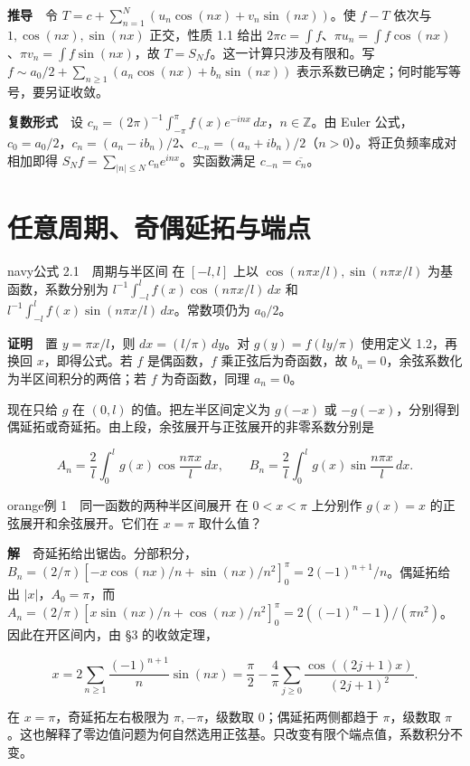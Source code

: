 \documentclass[12pt,a4paper]{article}
\newcommand{\mysection}[1]{\clearpage\section{#1}}
\begin{document}
\textbf{推导}　令 \(T=c+\sum_{n=1}^N (u_n\cos(nx)+v_n\sin(nx))\)。使 \(f-T\) 依次与 \(1,\cos(nx),\sin(nx)\) 正交，性质 1.1 给出 \(2\pi c=\int f\)、\(\pi u_n=\int f\cos(nx)\)、\(\pi v_n=\int f\sin(nx)\)，故 \(T=S_Nf\)。这一计算只涉及有限和。写 \(f\sim a_0/2+\sum_{n\ge1}(a_n\cos(nx)+b_n\sin(nx))\) 表示系数已确定；何时能写等号，要另证收敛。

\textbf{复数形式}　设 \(c_n=(2\pi)^{-1}\int_{-\pi}^{\pi}f(x)e^{-inx}\,dx\)，\(n\in\mathbb Z\)。由 Euler 公式，\(c_0=a_0/2\)，\(c_n=(a_n-ib_n)/2\)、\(c_{-n}=(a_n+ib_n)/2\)（\(n>0\)）。将正负频率成对相加即得 \(S_N f=\sum_{|n|\le N}c_ne^{inx}\)。实函数满足 \(c_{-n}=\overline{c_n}\)。

\mysection{任意周期、奇偶延拓与端点}




\begin{sboxenv}{navy}{公式 2.1　周期与半区间}
在 \([-l,l]\) 上以 \(\cos(n\pi x/l),\sin(n\pi x/l)\) 为基函数，系数分别为 \(l^{-1}\int_{-l}^l f(x)\cos(n\pi x/l)\,dx\) 和 \(l^{-1}\int_{-l}^l f(x)\sin(n\pi x/l)\,dx\)。常数项仍为 \(a_0/2\)。
\end{sboxenv}

\textbf{证明}　置 \(y=\pi x/l\)，则 \(dx=(l/\pi)\,dy\)。对 \(g(y)=f(ly/\pi)\) 使用定义 1.2，再换回 \(x\)，即得公式。若 \(f\) 是偶函数，\(f\) 乘正弦后为奇函数，故 \(b_n=0\)，余弦系数化为半区间积分的两倍；若 \(f\) 为奇函数，同理 \(a_n=0\)。

现在只给 \(g\) 在 \((0,l)\) 的值。把左半区间定义为 \(g(-x)\) 或 \(-g(-x)\)，分别得到偶延拓或奇延拓。由上段，余弦展开与正弦展开的非零系数分别是

\[
 A_n=\frac{2}{l}\int_0^l g(x)\cos\frac{n\pi x}{l}\,dx,\qquad
 B_n=\frac{2}{l}\int_0^l g(x)\sin\frac{n\pi x}{l}\,dx .
\]

\begin{sboxenv}{orange}{例 1　同一函数的两种半区间展开}
在 \(0<x<\pi\) 上分别作 \(g(x)=x\) 的正弦展开和余弦展开。它们在 \(x=\pi\) 取什么值？
\end{sboxenv}

\textbf{解}　奇延拓给出锯齿。分部积分，\(B_n=(2/\pi)[-x\cos(nx)/n+\sin(nx)/n^2]_0^\pi=2(-1)^{n+1}/n\)。偶延拓给出 \(|x|\)，\(A_0=\pi\)，而 \(A_n=(2/\pi)[x\sin(nx)/n+\cos(nx)/n^2]_0^\pi=2((-1)^n-1)/(\pi n^2)\)。因此在开区间内，由 §3 的收敛定理，

\[
 x=2\sum_{n\ge1}\frac{(-1)^{n+1}}{n}\sin(nx)
 =\frac{\pi}{2}-\frac{4}{\pi}\sum_{j\ge0}
 \frac{\cos((2j+1)x)}{(2j+1)^2}.
\]

在 \(x=\pi\)，奇延拓左右极限为 \(\pi,-\pi\)，级数取 \(0\)；偶延拓两侧都趋于 \(\pi\)，级数取 \(\pi\)。这也解释了零边值问题为何自然选用正弦基。只改变有限个端点值，系数积分不变。
\end{document}
